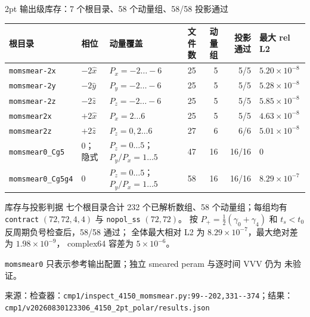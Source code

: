 \documentclass[UTF8,aspectratio=169,11pt]{ctexbeamer}
\newcommand{\source}[1]{\vspace{0.05em}\par{\raggedright\scriptsize\color{muted}来源：#1\par}}
\newcommand{\codepath}[1]{\nolinkurl{#1}}
\newcommand{\unverified}{\textcolor{warning}{未验证}}
\begin{document}
\begin{frame}[t]{2pt 输出级库存：7 个根目录、58 个动量组、58/58 投影通过}
  \scriptsize
  \setlength{\tabcolsep}{2.5pt}
  \renewcommand{\arraystretch}{1.00}
  \begin{tabular}{@{}l l l r r r l@{}}
    \toprule
    根目录 & 相位 & 动量覆盖 & 文件数 & 动量组 & 投影通过 & 最大 rel L2\\
    \midrule
    \codepath{momsmear-2x} & $-2\hat x$ & $P_x=-2\ldots-6$ & 25 & 5 & 5/5 & $5.20\times10^{-8}$\\
    \codepath{momsmear-2y} & $-2\hat y$ & $P_y=-2\ldots-6$ & 25 & 5 & 5/5 & $5.28\times10^{-8}$\\
    \codepath{momsmear-2z} & $-2\hat z$ & $P_z=-2\ldots-6$ & 25 & 5 & 5/5 & $5.85\times10^{-8}$\\
    \codepath{momsmear2x} & $+2\hat x$ & $P_x=2\ldots6$ & 25 & 5 & 5/5 & $4.63\times10^{-8}$\\
    \codepath{momsmear2z} & $+2\hat z$ & $P_z=0,2\ldots6$ & 27 & 6 & 6/6 & $5.01\times10^{-8}$\\
    \codepath{momsmear0_Cg5} & $0$；隐式 & $P_z=0\ldots5$；$P_y/P_x=1\ldots5$ & 47 & 16 & 16/16 & $0$\\
    \codepath{momsmear0_Cg5g4} & $0$ & $P_z=0\ldots5$；$P_y/P_x=1\ldots5$ & 58 & 16 & 16/16 & $8.29\times10^{-7}$\\
    \bottomrule
  \end{tabular}
  \vspace{0.10em}
  \begin{block}{库存与投影判据}
    七个根目录合计 232 个已解析数组、58 个动量组；每组均有
    \codepath{contract} $(72,72,4,4)$ 与 \codepath{nopol\_ss} $(72,72)$。
    按 $P_+=\frac12(\gamma_0+\gamma_4)$ 和 $t_s<t_0$ 反周期负号检查后，58/58 通过；
    全体最大相对 L2 为 $8.29\times10^{-7}$，最大绝对差为 $1.98\times10^{-9}$，
    complex64 容差为 $5\times10^{-6}$。
  \end{block}
  \colorbox{warnbg}{\parbox{0.94\linewidth}{\centering
    \codepath{momsmear0} 只表示参考输出配置；独立 smeared peram 与逐时间 VVV 仍为 \unverified。}}
  \source{检查器：\codepath{cmp1/inspect_4150_momsmear.py:99--202,331--374}；结果：\codepath{cmp1/v20260830123306_4150_2pt_polar/results.json}}
\end{frame}
\end{document}
